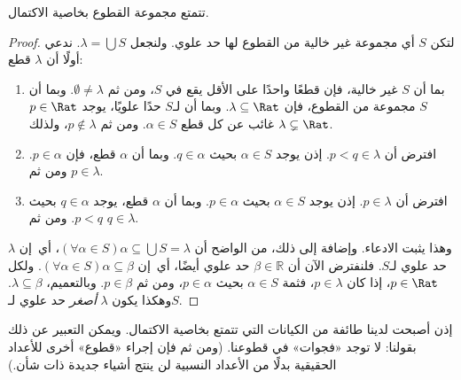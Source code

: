 \documentclass[../../../include/open-logic-section]{subfiles}
\begin{document}
\begin{thm}
تتمتع مجموعة القطوع بخاصية الاكتمال.
\end{thm}

\begin{proof}
  لتكن $S$ أي مجموعة غير خالية من القطوع لها حد علوي. ولنجعل $\lambda
  = \bigcup S$.
ندعي أولًا أن $\lambda$ قطع:
\begin{enumerate}
\item بما أن $S$ غير خالية، فإن قطعًا واحدًا على الأقل يقع في $S$،
ومن ثم $\emptyset \neq \lambda$. وبما أن $S$ مجموعة من القطوع، فإن
$\lambda \subseteq \Rat$. وبما أن لـ$S$ حدًا علويًا، يوجد $p \in
\Rat$ غائب عن كل قطع $\alpha \in S$. ومن ثم $p\notin \lambda$، ولذلك
$\lambda \subsetneq \Rat$.
\item افترض أن $p < q \in \lambda$. إذن يوجد $\alpha \in S$ بحيث
$q \in \alpha$. وبما أن $\alpha$ قطع، فإن $p \in \alpha$. ومن ثم
$p \in \lambda$.
\item افترض أن $p \in \lambda$. إذن يوجد $\alpha \in S$ بحيث $p \in
\alpha$. وبما أن $\alpha$ قطع، يوجد $q \in \alpha$ بحيث $p < q$.
ومن ثم $q \in \lambda$.
\end{enumerate}
وهذا يثبت الادعاء. وإضافة إلى ذلك، من الواضح أن
$(\forall \alpha \in S)\alpha \subseteq \bigcup S = \lambda$، أي\ إن
$\lambda$ حد علوي لـ$S$. فلنفترض الآن أن $\beta \in \mathbb{R}$ حد
علوي أيضًا، أي\ إن $(\forall \alpha \in S)\alpha \subseteq \beta$.
ولكل $p \in \Rat$، إذا كان $p \in \lambda$، فثمة $\alpha \in S$
بحيث $p \in \alpha$، ومن ثم $p \in \beta$. وبالتعميم، $\lambda
\subseteq \beta$. وهكذا يكون $\lambda$ \emph{أصغر} حد علوي لـ$S$.
\end{proof}

إذن أصبحت لدينا طائفة من الكيانات التي تتمتع بخاصية الاكتمال. ويمكن
التعبير عن ذلك بقولنا: لا توجد «فجوات» في قطوعنا. (ومن ثم فإن إجراء
«قطوع» أخرى للأعداد الحقيقية بدلًا من الأعداد النسبية لن ينتج أشياء
جديدة ذات شأن.)
\end{document}
